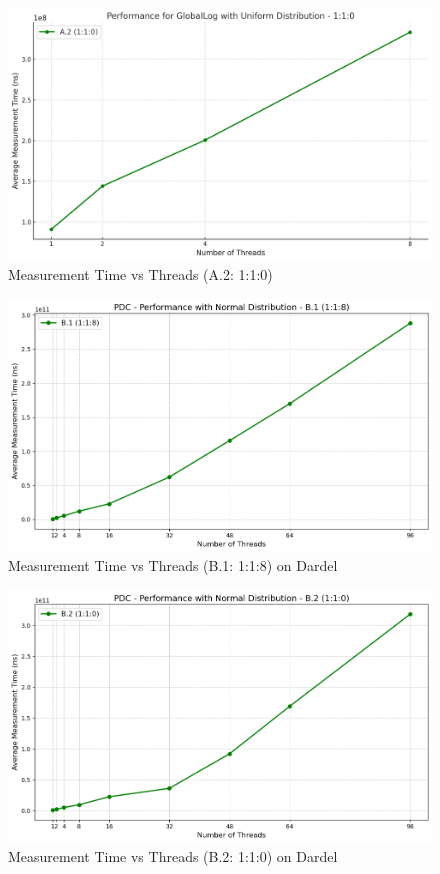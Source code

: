 \documentclass{article}
\begin{document}
\begin{figure}[H]
    \centering
    \includegraphics[width=\textwidth]{LaTex/images/Lab 3 2.5.2.2.png}
    \caption{Measurement Time vs Threads (A.2: 1:1:0)}
    \label{fig:global-log-1-1-0}
\end{figure}

\begin{figure}[H]
    \centering
    \includegraphics[width=\textwidth]{LaTex/images/Lab 3 2.5.2.3.png}
    \caption{Measurement Time vs Threads (B.1: 1:1:8) on Dardel}
    \label{fig:global-log-1-1-8}
\end{figure}

\begin{figure}[H]
    \centering
    \includegraphics[width=\textwidth]{LaTex/images/Lab 3 2.5.2.4.png}
    \caption{Measurement Time vs Threads (B.2: 1:1:0) on Dardel}
    \label{fig:global-log-1-1-0}
\end{figure}
\end{document}
